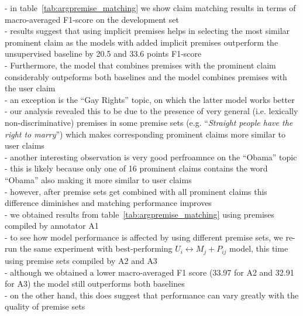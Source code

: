 - in table~\ref{tab:argpremise_matching} we show claim matching results in terms of
macro-averaged F1-score on the development set \\
- results suggest that using implicit premises helps in selecting the most similar prominent claim 
as the models with added implicit premises outperform the unsupervised baseline by
20.5 and 33.6 points F1-score \\
- Furthermore, the model that combines premises with the prominent claim considerably 
outpeforms both baselines and the model combines premises with the user claim \\
- an exception is the ``Gay Rights'' topic, on which the latter model works better \\
- our analysis revealed this to be due to the presence of very general 
(i.e. lexically non-discriminative) premises in some premise sets (e.g. ``\emph{Straight people
have the right to marry}'') which makes corresponding prominent claims more similar to
user claims \\
- another interesting observation is very good perfroamnce on the ``Obama'' topic \\
- this is likely because only one of 16 prominent claims contains the word ``Obama''
also making it more similar to user claims \\
- however, after premise sets get combined with all prominent claims this difference diminishes 
and matching performance improves \\
- we obtained results from table~\ref{tab:argpremise_matching} using premises compiled by
annotator A1 \\
- to see how model performance is affected by using different premise sets, we re-run the same
experiment with best-performing $U_i \leftrightarrow M_j + P_{ij}$ model, this time using 
premise sets compiled by A2 and A3 \\
- although we obtained a lower macro-averaged F1 score (33.97 for A2 and 32.91 for A3) the model 
still outperforms both baselines \\
- on the other hand, this does suggest that performance can vary greatly with the quality of 
premise sets \\

